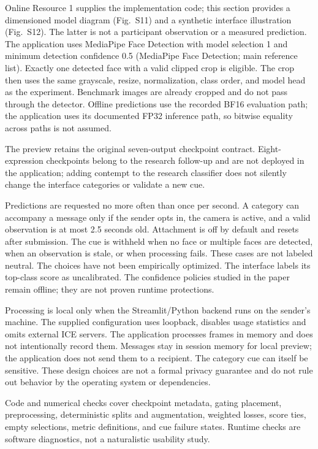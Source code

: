 \documentclass[10pt]{article}
\begin{document}
Online Resource 1 supplies the implementation code; this section provides a dimensioned model diagram (Fig.~S11) and a synthetic interface illustration (Fig.~S12). The latter is not a participant observation or a measured prediction.
The application uses MediaPipe Face Detection with model selection 1 and minimum detection confidence 0.5 (MediaPipe Face Detection; main reference list). Exactly one detected face with a valid clipped crop is eligible. The crop then uses the same grayscale, resize, normalization, class order, and model head as the experiment. Benchmark images are already cropped and do not pass through the detector. Offline predictions use the recorded BF16 evaluation path; the application uses its documented FP32 inference path, so bitwise equality across paths is not assumed.

The preview retains the original seven-output checkpoint contract. Eight-expression checkpoints belong to the research follow-up and are not deployed in the application; adding contempt to the research classifier does not silently change the interface categories or validate a new cue.

Predictions are requested no more often than once per second. A category can accompany a message only if the sender opts in, the camera is active, and a valid observation is at most 2.5 seconds old. Attachment is off by default and resets after submission. The cue is withheld when no face or multiple faces are detected, when an observation is stale, or when processing fails. These cases are not labeled neutral. The choices have not been empirically optimized. The interface labels its top-class score as uncalibrated. The confidence policies studied in the paper remain offline; they are not proven runtime protections.

Processing is local only when the Streamlit/Python backend runs on the sender's machine. The supplied configuration uses loopback, disables usage statistics and omits external ICE servers. The application processes frames in memory and does not intentionally record them. Messages stay in session memory for local preview; the application does not send them to a recipient. The category cue can itself be sensitive. These design choices are not a formal privacy guarantee and do not rule out behavior by the operating system or dependencies.

Code and numerical checks cover checkpoint metadata, gating placement, preprocessing, deterministic splits and augmentation, weighted losses, score ties, empty selections, metric definitions, and cue failure states. Runtime checks are software diagnostics, not a naturalistic usability study.
\end{document}
